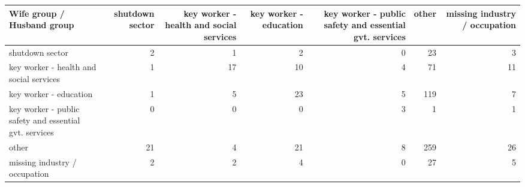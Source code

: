 
\begin{tabular}{lrrrrrr}
\toprule
Wife group / Husband group & shutdown sector & key worker - health
 and social services & key worker - education & key worker - public safety
 and essential gvt. services & other & missing industry / occupation\\
\midrule
shutdown sector & 2 & 1 & 2 & 0 & 23 & 3\\
key worker - health
 and social services & 1 & 17 & 10 & 4 & 71 & 11\\
key worker - education & 1 & 5 & 23 & 5 & 119 & 7\\
key worker - public safety
 and essential gvt. services & 0 & 0 & 0 & 3 & 1 & 1\\
other & 21 & 4 & 21 & 8 & 259 & 26\\
missing industry / occupation & 2 & 2 & 4 & 0 & 27 & 5\\
\bottomrule
\end{tabular}
